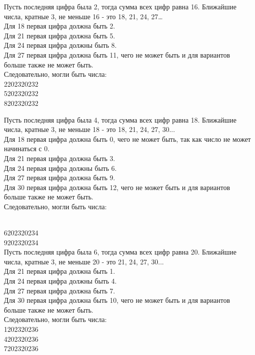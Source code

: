 Пусть последняя цифра была 2, тогда сумма всех цифр равна 16. Ближайшие числа, кратные 3, не меньше 16 - это 18, 21, 24, 27…\\
Для 18 первая цифра должна быть 2.\\
Для 21 первая цифра должна быть 5.\\
Для 24 первая цифра должны быть 8.\\
Для 27 первая цифра должна быть 11, чего не может быть и для вариантов больше также не может быть.\\
Следовательно, могли быть числа:\\
2202320232\\
5202320232\\
8202320232 

Пусть последняя цифра была 4, тогда сумма всех цифр равна 18. Ближайшие числа, кратные 3, не меньше 18 - это 18, 21, 24, 27, 30...\\
Для 18 первая цифра должна быть 0, чего не может быть, так как число не может начинаться с 0.\\
Для 21 первая цифра должна быть 3.\\
Для 24 первая цифра должны быть 6.\\
Для 27 первая цифра должна быть 9.\\
Для 30 первая цифра должна быть 12, чего не может быть и для вариантов больше также не может быть.\\
Следовательно, могли быть числа:

\newpage

\hspace{3mm}

\\
6202320234\\
9202320234\\
Пусть последняя цифра была 6, тогда сумма всех цифр равна 20. Ближайшие числа, кратные 3, не меньше 20 - это 21, 24, 27, 30...\\
Для 21 первая цифра должна быть 1.\\
Для 24 первая цифра должны быть 4.\\
Для 27 первая цифра должна быть 7.\\
Для 30 первая цифра должна быть 10, чего не может быть и для вариантов больше также не может быть.\\
Следовательно, могли быть числа:\\
1202320236\\
4202320236\\
7202320236 

